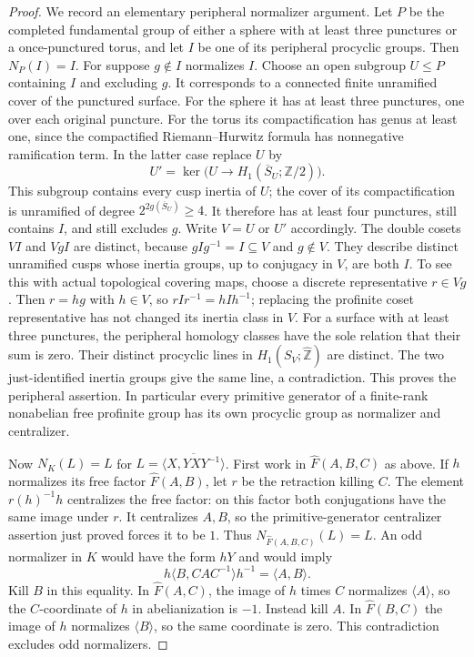 \begin{proof}
We record an elementary peripheral normalizer
argument.  Let $P$ be the completed fundamental
group of either a sphere with at least three punctures or a
once-punctured torus, and let $I$ be one of its
peripheral procyclic groups.  Then $N_P(I)=I$.
For suppose $g\notin I$ normalizes $I$.  Choose
an open subgroup $U\leq P$ containing $I$ and
excluding $g$.  It corresponds to a connected
finite unramified cover of the punctured surface.
For the sphere it has at least three punctures,
one over each original puncture.  For the torus
its compactification has genus at least one,
since the compactified Riemann--Hurwitz formula
has nonnegative ramification term.  In the latter
case replace $U$ by
\[
 U'=\ker\bigl(U\longrightarrow
      H_1(\overline S_U;\mathbb Z/2)\bigr).
\]
This subgroup contains every cusp inertia of $U$;
the cover of its compactification is unramified
of degree $2^{2g(\overline S_U)}\geq4$.  It
therefore has at least four punctures, still
contains $I$, and still excludes $g$.
Write $V=U$ or $U'$ accordingly.  The double
cosets $VI$ and $VgI$ are distinct, because
$gIg^{-1}=I\subseteq V$ and $g\notin V$.
They describe distinct unramified cusps whose
inertia groups, up to conjugacy in $V$, are
both $I$.  To see this with actual topological
covering maps, choose a discrete representative
$r\in Vg$.  Then $r=hg$ with $h\in V$, so
$rIr^{-1}=hIh^{-1}$; replacing the profinite
coset representative has not changed its
inertia class in $V$.
For a surface with at least three punctures,
the peripheral homology classes have the sole
relation that their sum is zero.  Their distinct
procyclic lines in
$H_1(S_V;\widehat{\mathbb Z})$ are distinct.
The two just-identified inertia groups give the
same line, a contradiction.  This proves the
peripheral assertion.  In particular every
primitive generator of a finite-rank nonabelian free profinite
group has its own procyclic group as normalizer
and centralizer.

Now $N_K(L)=L$ for
$L=\overline{\langle X,YXY^{-1}\rangle}$.
First work in $\widehat F(A,B,C)$ as above.
If $h$ normalizes its free factor $\widehat F(A,B)$,
let $r$ be the retraction killing $C$.
The element $r(h)^{-1}h$ centralizes the free
factor: on this factor both conjugations have
the same image under $r$.  It centralizes $A,B$,
so the primitive-generator centralizer assertion
just proved forces it to be $1$.
Thus $N_{\widehat F(A,B,C)}(L)=L$.
An odd normalizer in $K$ would have the form
$hY$ and would imply
\[
 h\langle B,CAC^{-1}\rangle h^{-1}=\langle A,B\rangle.
\]
Kill $B$ in this equality.  In $\widehat F(A,C)$,
the image of $h$ times $C$ normalizes
$\langle A\rangle$, so the $C$-coordinate of
$h$ in abelianization is $-1$.
Instead kill $A$.  In $\widehat F(B,C)$ the
image of $h$ normalizes $\langle B\rangle$, so
the same coordinate is zero.  This contradiction
excludes odd normalizers.


\end{proof}
